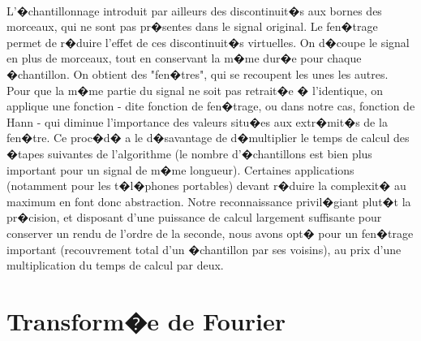 {\paragraph{}
	L'�chantillonnage introduit par ailleurs des discontinuit�s aux bornes des morceaux, qui ne sont pas pr�sentes 
	dans le signal original. Le fen�trage permet de r�duire l'effet de ces discontinuit�s virtuelles. 
	On d�coupe le signal en plus de morceaux, tout en conservant la m�me dur�e pour chaque �chantillon. 
	On obtient des "fen�tres", qui se recoupent les unes les autres. 
	Pour que la m�me partie du signal ne soit pas retrait�e � l'identique, 
	on applique une fonction - dite fonction de fen�trage, ou dans notre cas, fonction de Hann - 
	qui diminue l'importance des valeurs situ�es aux extr�mit�s de la fen�tre. 
	Ce proc�d� a le d�savantage de d�multiplier le temps de calcul des �tapes suivantes de 
	l'algorithme (le nombre d'�chantillons est bien plus important pour un signal de m�me longueur). 
	Certaines applications (notamment pour les t�l�phones portables) devant r�duire la complexit� au 
	maximum en font donc abstraction. Notre reconnaissance privil�giant plut�t la pr�cision, et 
	disposant d'une puissance de calcul largement suffisante pour conserver un rendu de l'ordre de 
	la seconde, nous avons opt� pour un fen�trage important (recouvrement total d'un �chantillon par ses voisins), 
	au prix d'une multiplication du temps de calcul par deux.

        	\section{Transform�e de Fourier}
}

